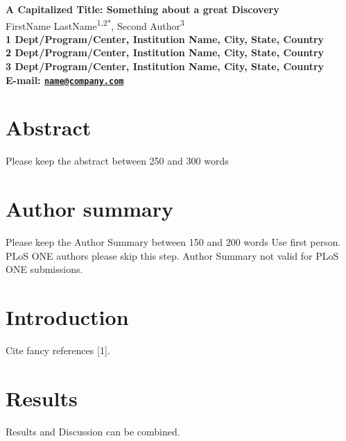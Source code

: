 \documentclass[10pt]{article}
\date{}
\begin{document}
\begin{flushleft}
{\Large
\textbf{A Capitalized Title: Something about a great Discovery}
}
\\
  FirstName LastName\textsuperscript{1,2*},
  Second Author\textsuperscript{3}\\
\bf{1} Dept/Program/Center, Institution Name,  City,  State,  Country
\\
\bf{2} Dept/Program/Center, Institution Name,  City,  State,  Country
\\
\bf{3} Dept/Program/Center, Institution Name,  City,  State,  Country
\\

\textasteriskcentered{} E-mail:   \href{mailto:name@company.com}{\nolinkurl{name@company.com}}
  

\end{flushleft}

\section*{Abstract}\label{abstract}

Please keep the abstract between 250 and 300 words

\section*{Author summary}\label{author-summary}

Please keep the Author Summary between 150 and 200 words Use first
person. PLoS ONE authors please skip this step. Author Summary not valid
for PLoS ONE submissions.

\section*{Introduction}\label{introduction}

Cite fancy references {[}1{]}.

\section*{Results}\label{results}

Results and Discussion can be combined.
\end{document}
